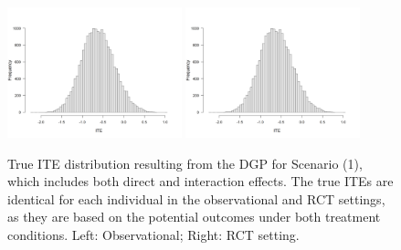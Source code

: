 \begin{figure}[htbp]
\centering
\includegraphics[width=0.45\textwidth]{img/results/observ_scenario1_ite_distribution_dgp.png}
\includegraphics[width=0.45\textwidth]{img/results/rct_scenario1_ite_distribution_dgp.png}
\caption{True ITE distribution resulting from the DGP for Scenario (1), which includes both direct and interaction effects. The true ITEs are identical for each individual in the observational and RCT settings, as they are based on the potential outcomes under both treatment conditions. Left: Observational; Right: RCT setting.}
\label{fig:scenario1_ite_distribution_dgp}
\end{figure}



